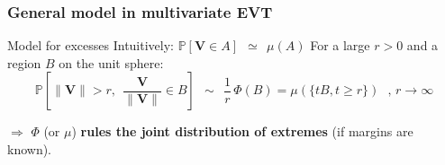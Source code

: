 \documentclass[10pt]{beamer}
\def\mb{\mathbf}
\begin{document}
\begin{frame}
\frametitle{General model in multivariate EVT}
\begin{block}{ { Model} for excesses }
Intuitively:  $\mathbb{P} [\mb V \in A]~~\simeq~~\mu(A)$
For a large $r>0$ and a region $B$ on the unit sphere: $$ \mathbb{P}\left[\|\mb V\|> r  ,~~\mb{\frac{V}{\|V\|}} \in B \right]  ~~\sim~~  \frac{1}{r}\,\Phi(B)  = \mu(\{t B, t\ge r\})  \text{~~,~} {r \to \infty}$$
\end{block}
\vspace*{.5cm}
$\Rightarrow$ $\Phi$ (or $\mu$) \textbf{rules the joint distribution of extremes} (if margins are known).
\end{frame}
\end{document}
